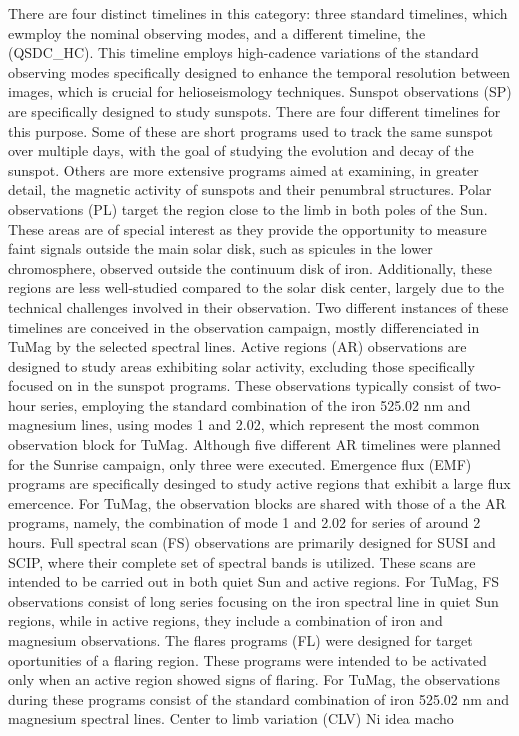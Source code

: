 \begin{itemize}
  There are four distinct timelines in this category: three standard timelines, which ewmploy the nominal observing modes, and a different timeline, the (QSDC{\_}HC). This timeline employs high-cadence variations of the standard observing modes specifically designed to enhance the temporal resolution between images, which is crucial for helioseismology techniques.
  \Myitem Sunspot observations (SP) are specifically designed to study sunspots. There are four different timelines for this purpose. Some of these are short programs used to track the same sunspot over multiple days, with the goal of studying the evolution and decay of the sunspot. Others are more extensive programs aimed at examining, in greater detail, the magnetic activity of sunspots and their penumbral structures.
  \Myitem Polar observations (PL) target the region close to the limb in both poles of the Sun. These areas are of special interest as they provide the opportunity to measure faint signals outside the main solar disk, such as spicules in the lower chromosphere, observed outside the continuum disk of iron. Additionally, these regions are less well-studied compared to the solar disk center, largely due to the technical challenges involved in their observation. Two different instances of these timelines are conceived in the observation campaign, mostly differenciated in TuMag by the selected spectral lines.
  \Myitem 
  Active regions (AR) observations are designed to study areas exhibiting solar activity, excluding those specifically focused on in the sunspot programs. These observations typically consist of two-hour series, employing the standard combination of the iron 525.02 nm and magnesium lines, using modes 1 and 2.02, which represent the most common observation block for TuMag. Although five different AR timelines were planned for the Sunrise campaign, only three were executed.
  \Myitem Emergence flux (EMF) programs are specifically desinged to study active regions that exhibit a large flux emercence. For TuMag, the observation blocks are shared with those of a the AR programs, namely, the combination of mode 1 and 2.02 for series of around 2 hours. 
  \Myitem Full spectral scan (FS) observations are primarily designed for SUSI and SCIP, where their complete set of spectral bands is utilized. These scans are intended to be carried out in both quiet Sun and active regions. For TuMag, FS observations consist of long series focusing on the iron spectral line in quiet Sun regions, while in active regions, they include a combination of iron and magnesium observations.
  \Myitem The flares programs (FL) were designed for target oportunities of a flaring region. These programs were intended to be activated only when an active region showed signs of flaring. For TuMag, the observations during these programs consist of the standard combination of iron 525.02 nm and magnesium spectral lines.
  \Myitem Center to limb variation (CLV)  Ni idea macho 
\end{itemize}

